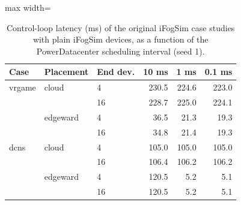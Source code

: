 \begin{table}[htbp]
\centering
\caption{Control-loop latency (ms) of the original iFogSim case studies with plain iFogSim devices, as a function of the PowerDatacenter scheduling interval (seed 1).}
\label{tab:gupta-scheduling}
\begin{adjustbox}{max width=\textwidth}
\begin{tabular}{lllrrr}
\toprule
Case & Placement & End dev. & 10 ms & 1 ms & 0.1 ms \\
\midrule
vrgame & cloud & 4 & 230.5 & 224.6 & 223.0 \\
 &  & 16 & 228.7 & 225.0 & 224.1 \\
 & edgeward & 4 & 36.5 & 21.3 & 19.3 \\
 &  & 16 & 34.8 & 21.4 & 19.3 \\
dcns & cloud & 4 & 105.0 & 105.0 & 105.0 \\
 &  & 16 & 106.4 & 106.2 & 106.2 \\
 & edgeward & 4 & 120.5 & 5.2 & 5.1 \\
 &  & 16 & 120.5 & 5.2 & 5.1 \\
\bottomrule
\end{tabular}
\end{adjustbox}
\end{table}
